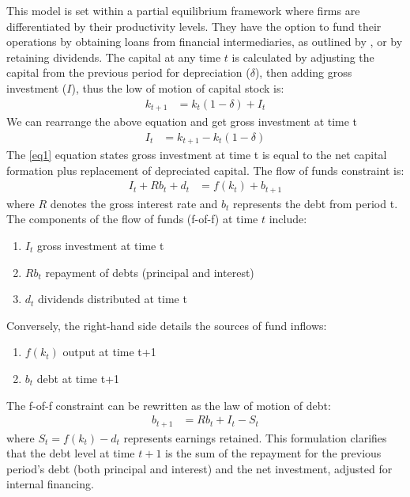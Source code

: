 \documentclass[12pt]{report}
\begin{document}
This model is set within a partial equilibrium framework where firms are differentiated by their productivity levels.
They have the option to fund their operations by obtaining loans from financial intermediaries, as outlined by
\cite{bernanke1995inside}, or by retaining dividends. The capital at any time \(t\) is calculated by
adjusting the capital from the previous period for depreciation (\(\delta\)), then adding gross investment (\(I\)), thus the
low of motion of capital stock is: 
\begin{align*}
    k_{t+1} &= k_{t}(1 - \delta)  + I_t  
\end{align*} 
We can rearrange  the above equation and get gross investment at time t
\begin{align}
    I_t &= k_{t+1} - k_{t}\left(1-\delta\right) \label{eq1}
\end{align} 
The \ref{eq1} equation states gross investment at time t is equal to the net capital formation plus replacement
of depreciated capital. 
The flow of funds constraint is:
\begin{align}
    I_t + R b_{t} + d_t &= f(k_t) + b_{t+1} \label{eq2}
\end{align}
where \(R\) denotes the gross interest rate and \(b_{t}\) represents the debt from period t.
The components of the flow of funds (f-of-f) at time \(t\) include:
\begin{enumerate}
    \item \(I_t\) gross investment at time t
    \item \(R b_{t}\) repayment of debts (principal and interest) 
    \item \(d_t\) dividends distributed at time t
\end{enumerate}

Conversely, the right-hand side details the sources of fund inflows:
\begin{enumerate}
    \item \(f(k_{t}) \) output at time t+1
    \item  \(b_t\) debt at time t+1
\end{enumerate}

The f-of-f constraint can be rewritten as the law of motion of debt: 
\begin{align} 
    b_{t+1} &= R b_{t} + I_{t} - S_{t}  \label{eq2'}
\end{align} 
where \(S_{t} = f(k_{t}) - d_t\) represents  earnings  retained.
This formulation clarifies that the debt level at time \(t+1\) is the sum of the repayment for the previous period's debt
(both principal and interest) and the net investment, adjusted for internal financing.
\end{document}
